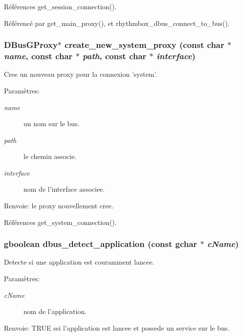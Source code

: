 Références get\_\-session\_\-connection().

Référencé par get\_\-main\_\-proxy(), et rhythmbox\_\-dbus\_\-connect\_\-to\_\-bus().
\subsubsection{\setlength{\rightskip}{0pt plus 5cm}DBusGProxy$\ast$ create\_\-new\_\-system\_\-proxy (const char $\ast$ {\em name}, \/  const char $\ast$ {\em path}, \/  const char $\ast$ {\em interface})}\label{cid-dbus_8h_c173b624ca07b24abe909dd19d4b740b}


Cree un nouveau proxy pour la connexion 'system'. \begin{Desc}
\item[Paramètres:]
\begin{description}
\item[{\em name}]un nom sur le bus. \item[{\em path}]le chemin associe. \item[{\em interface}]nom de l'interface associee. \end{description}
\end{Desc}
\begin{Desc}
\item[Renvoie:]le proxy nouvellement cree. \end{Desc}


Références get\_\-system\_\-connection().
\subsubsection{\setlength{\rightskip}{0pt plus 5cm}gboolean dbus\_\-detect\_\-application (const gchar $\ast$ {\em cName})}\label{cid-dbus_8h_a067a9c5c52e97de30de114afa353f22}


Detecte si une application est couramment lancee. \begin{Desc}
\item[Paramètres:]
\begin{description}
\item[{\em cName}]nom de l'application. \end{description}
\end{Desc}
\begin{Desc}
\item[Renvoie:]TRUE ssi l'application est lancee et possede un service sur le bus. \end{Desc}



